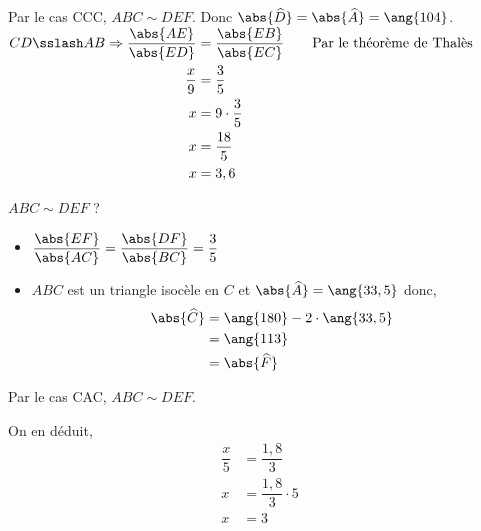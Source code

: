 \begin{tasks}
        Par le cas CCC, $ABC \sim DEF$. Donc $\abs{\widehat{D}} = \abs{\widehat{A}} = \ang{104}$.
        \task
        $
            \begin{aligned}[t]
                CD \sslash AB \Rightarrow
                \dfrac{\abs{AE}}{\abs{ED}} & = \dfrac{\abs{EB}}{\abs{EC}}
                \qquad\text{Par le théorème de Thalès}                    \\
                \dfrac{x}{9}               & = \dfrac{3}{5}               \\
                x                          & = 9\cdot\dfrac{3}{5}         \\
                x                          & = \dfrac{18}{5}              \\
                x                          & = 3,6
            \end{aligned}
        $

        \task \(ABC \sim DEF \) ?
        \begin{itemize}
            \item \(\dfrac{\abs{EF}}{\abs{AC}}=\dfrac{\abs{DF}}{\abs{BC}}=\dfrac{3}{5}\)
            \item \(ABC\) est un triangle isocèle en \(C\) et \(\abs{\widehat{A}}=\ang{33,5}\) donc,
                  \begin{align*}
                      \abs{\widehat{C}} & =\ang{180}-2\cdot \ang{33,5} \\
                                        & =\ang{113}                   \\
                                        & =\abs{\widehat{F}}
                  \end{align*}
        \end{itemize}
        Par le cas CAC, \(ABC \sim DEF\).

        On en déduit,
        \begin{align*}
            \dfrac{x}{5} & = \dfrac{1,8}{3}         \\
            x            & = \dfrac{1,8}{3} \cdot 5 \\
            x            & = 3
        \end{align*}
    \end{tasks}
